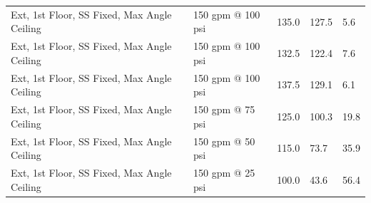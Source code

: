 \documentclass{book}
\begin{document}
\begin{table}[]
\begin{tabular}{lllll}
Ext, 1st Floor, SS Fixed, Max Angle Ceiling           & 150 gpm @ 100 psi                   & 135.0                                  & 127.5                                   & 5.6                                     \\
Ext, 1st Floor, SS Fixed, Max Angle Ceiling           & 150 gpm @ 100 psi                   & 132.5                                  & 122.4                                   & 7.6                                     \\
Ext, 1st Floor, SS Fixed, Max Angle Ceiling           & 150 gpm @ 100 psi                   & 137.5                                  & 129.1                                   & 6.1                                     \\
Ext, 1st Floor, SS Fixed, Max Angle Ceiling           & 150 gpm @ 75 psi                    & 125.0                                  & 100.3                                   & 19.8                                    \\
Ext, 1st Floor, SS Fixed, Max Angle Ceiling           & 150 gpm @ 50 psi                    & 115.0                                  & 73.7                                    & 35.9                                    \\
Ext, 1st Floor, SS Fixed, Max Angle Ceiling           & 150 gpm @ 25 psi                    & 100.0                                  & 43.6                                    & 56.4                                   
\end{tabular}
\end{table}


\end{document}
